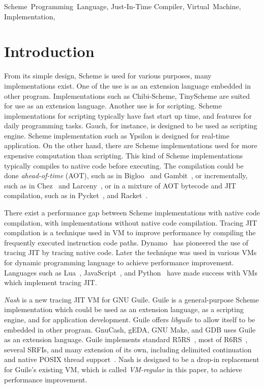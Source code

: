 \documentclass[preprint, 10pt]{sigplanconf}
\begin{document}

\keywords{} Scheme~Programming~Language, Just-In-Time Compiler, Virtual~Machine,
Implementation,

\section{Introduction}

From its simple design, Scheme is used for various purposes, many
implementations exist. One of the use is as an extension language embedded in
other program. Implementations such as Chibi-Scheme, TinyScheme are suited for
use as an extension language. Another use is for scripting. Scheme
implementations for scripting typically have fast start up time, and features
for daily programming tasks. Gauch, for instance, is designed to be used as
scripting engine. Scheme implementation such as Ypsilon is designed for
real-time application. On the other hand, there are Scheme implementations used
for more expensive computation than scripting. This kind of Scheme
implementations typically compiles to native code before executing. The
compilation could be done \textit{ahead-of-time} (AOT), such as in
Bigloo~\cite{serrano1995bigloo} and Gambit~\cite{feeley1998gambit}, or
incrementally, such as in Chez~\cite{dybvig2006development} and
Larceny~\cite{hansen1992impact}, or in a mixture of AOT bytecode and JIT
compilation, such as in Pycket~\cite{bauman2015pycket}, and
Racket~\cite{flatt2013racket}.

There exist a performance gap between Scheme implementations with native code
compilation, with implementations without native code compilation. Tracing JIT
compilation is a technique used in VM to improve performance by compiling the
frequently executed instruction code paths. Dynamo~\cite{bala2000dynamo} has
pioneered the use of tracing JIT by tracing native code. Later the technique was
used in various VMs for dynamic programming language to achieve performance
improvement. Languages such as Lua~\cite{pall2016luajit},
JavaScript~\cite{gal2009trace}, and Python~\cite{bolz2009tracing} have made
success with VMs which implement tracing JIT.\@

\textit{Nash} is a new tracing JIT VM for GNU Guile. Guile is a general-purpose
Scheme implementation which could be used as an extension language, as a
scripting engine, and for application development. Guile offers
\textit{libguile} to allow itself to be embedded in other program. GnuCash,
gEDA, GNU Make, and GDB uses Guile as an extension language. Guile implements
standard R5RS~\cite{abelson1998revised5}, most of
R6RS~\cite{sperber2010revised}, several SRFIs, and many extension of its own,
including delimited continuation and native POSIX thread
support~\cite{Galassi02guilereference}. Nash is designed to be a drop-in
replacement for Guile's existing VM, which is called \textit{VM-regular} in this
paper, to achieve performance improvement.
\end{document}
